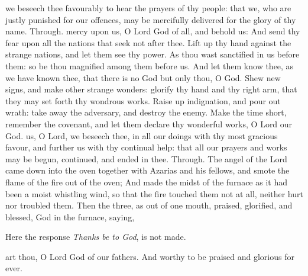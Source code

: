 \collect
{} we beseech thee favourably to hear the prayers of thy people: that we, who are justly punished for our offences, may be mercifully delivered for the glory of thy name. Through.
 mercy upon us, O Lord God of all, and behold us: And send thy fear upon all the nations that seek not after thee. Lift up thy hand against the strange nations, and let them see thy power. As thou wast sanctified in us before them: so be thou magnified among them before us. And let them know thee, as we have known thee, that there is no God but only thou, O God. Shew new signs, and make other strange wonders: glorify thy hand and thy right arm, that they may set forth thy wondrous works. Raise up indignation, and pour out wrath: take away the adversary, and destroy the enemy. Make the time short, remember the covenant, and let them declare thy wonderful works, O Lord our God.
\collect
{} us, O Lord, we beseech thee, in all our doings with thy most gracious favour, and further us with thy continual help: that all our prayers and works may be begun, continued, and ended in thee. Through.
 The angel of the Lord came down into the oven together with Azarias and his fellows, and smote the flame of the fire out of the oven; And made the midst of the furnace as it had been a moist whistling wind, so that the fire touched them not at all, neither hurt nor troubled them. Then the three, as out of one mouth, praised, glorified, and blessed, God in the furnace, saying,
\begin{rubric}
    Here the response \emph{Thanks be to God}, is not made.
\end{rubric}
 art thou, O Lord God of our fathers. And worthy to be praised and glorious for ever.\par
{}


